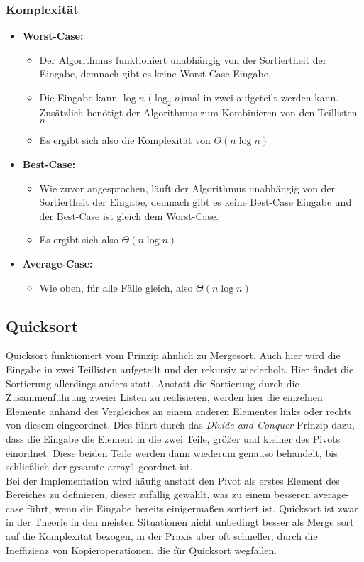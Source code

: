 \documentclass[
../../AuD-Zusammenfassung.tex,
]
{subfiles}
\begin{document}
\subsubsection{Komplexität}
\begin{itemize}
    \item \textbf{Worst-Case:}
    \begin{itemize}
        \item Der Algorithmus funktioniert unabhängig von der Sortiertheit der Eingabe, demnach gibt es keine Worst-Case Eingabe. 
        \item Die Eingabe kann $\log n$ ($\log_2 n$)mal in zwei aufgeteilt werden kann. Zusätzlich benötigt der Algorithmus zum Kombinieren von den Teillisten $n$
        \item Es ergibt sich also die Komplexität von $\Theta(n\log n)$
    \end{itemize}
    \item \textbf{Best-Case:}
    \begin{itemize}
        \item Wie zuvor angesprochen, läuft der Algorithmus unabhängig von der Sortiertheit der Eingabe, demnach gibt es keine Best-Case Eingabe und der Best-Case ist gleich dem Worst-Case.
        \item Es ergibt sich also $\Theta(n\log n)$
    \end{itemize}
    \item \textbf{Average-Case:}
    \begin{itemize}
        \item Wie oben, für alle Fälle gleich, also $\Theta(n\log n)$ 
    \end{itemize}
\end{itemize}

\subsection{Quicksort}

Quicksort funktioniert vom Prinzip ähnlich zu Mergesort. Auch hier wird die Eingabe in zwei Teillisten aufgeteilt und der rekursiv wiederholt. Hier findet die Sortierung allerdings anders statt. Anstatt die Sortierung durch die Zusammenführung zweier Listen zu realisieren, werden hier die einzelnen Elemente anhand des Vergleiches an einem anderen Elementes links oder rechts von diesem eingeordnet. Dies führt durch das \textit{Divide-and-Conquer} Prinzip dazu, dass die Eingabe die Element in die zwei Teile, größer und kleiner des Pivots einordnet. Diese beiden Teile werden dann wiederum genauso behandelt, bis schließlich der gesamte array1 geordnet ist.\\
Bei der Implementation wird häufig anstatt den Pivot als erstes Element des Bereiches zu definieren, dieser zufällig gewählt, was zu einem besseren average-case führt, wenn die Eingabe bereits einigermaßen sortiert ist. 
Quicksort ist zwar in der Theorie in den meisten Situationen nicht unbedingt besser als Merge sort auf die Komplexität bezogen, in der Praxis aber oft schneller, durch die Ineffizienz von Kopieroperationen, die für Quicksort wegfallen.
\newpage
\end{document}
